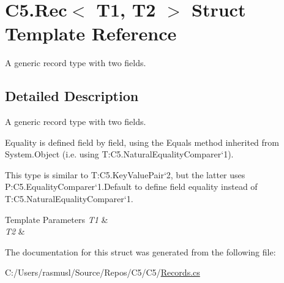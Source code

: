 \hypertarget{struct_c5_1_1_rec}{}\section{C5.\+Rec$<$ T1, T2 $>$ Struct Template Reference}
\label{struct_c5_1_1_rec}


A generic record type with two fields.  




\subsection{Detailed Description}
A generic record type with two fields. 

Equality is defined field by field, using the {\ttfamily Equals} method inherited from {\ttfamily System.\+Object} (i.\+e. using T\+:\+C5.\+Natural\+Equality\+Comparer`1). 

This type is similar to T\+:\+C5.\+Key\+Value\+Pair`2, but the latter uses P\+:\+C5.\+Equality\+Comparer`1.\+Default to define field equality instead of T\+:\+C5.\+Natural\+Equality\+Comparer`1. 


\begin{DoxyTemplParams}{Template Parameters}
{\em T1} & \\
\hline
{\em T2} & \\
\hline
\end{DoxyTemplParams}


The documentation for this struct was generated from the following file\+:\begin{DoxyCompactItemize}
\item 
C\+:/\+Users/rasmusl/\+Source/\+Repos/\+C5/\+C5/\hyperlink{_records_8cs}{Records.\+cs}\end{DoxyCompactItemize}

